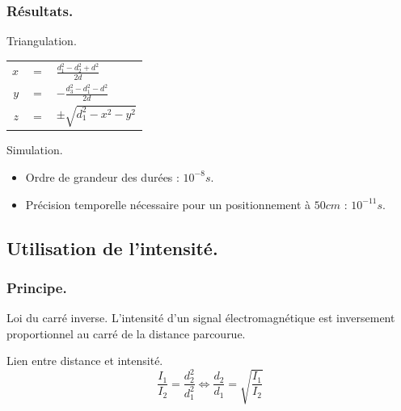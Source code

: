 \begin{frame}
    \frametitle{Résultats.}
    \begin{block}{Triangulation.}
        \begin{center}
            \begin{tabular}{rcl}
                $x$ & $=$ & $\frac{d_1^2-d_2^2+d^2}{2d}$ \\
                $y$ & $=$ & $-\frac{d_3^2-d_1^2-d^2}{2d}$ \\
                $z$ & $=$ & $\pm\sqrt{d_1^2-x^2-y^2}$ \\
            \end{tabular}
        \end{center}
    \end{block}
     {
        \begin{exampleblock}{Simulation.}
            \begin{itemize}
                \pause \item Ordre de grandeur des durées : $10^{-8}s$.
                \pause \item Précision temporelle nécessaire pour un positionnement à $50cm$ : $10^{-11}s$.
            \end{itemize}
        \end{exampleblock}
    }
\end{frame}

\subsection[Intensité]{Utilisation de l'intensité.}
\begin{frame}
    \frametitle{Principe.}
    \begin{exampleblock}{Loi du carré inverse.}
        L'intensité d'un signal électromagnétique est inversement proportionnel au carré de la distance parcourue.
    \end{exampleblock}
     { \begin{block}{Lien entre distance et intensité.}
            \[ \frac{I_1}{I_2} = \frac{d_2^2}{d_1^2} \Leftrightarrow \frac{d_2}{d_1} = \sqrt{\frac{I_1}{I_2}} \]
    \end{block} }
\end{frame}

